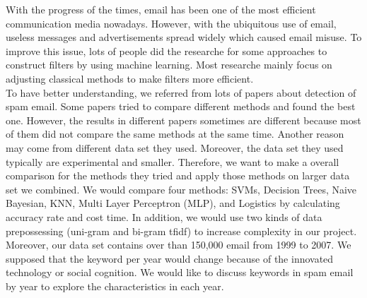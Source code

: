 
With the progress of the times, email has been one of the most efficient communication media nowadays. However, with the ubiquitous use of email, useless messages and advertisements spread widely which caused email misuse. To improve this issue, lots of people did the researche for some approaches to construct filters by using machine learning. Most researche mainly focus on adjusting classical methods to make filters more efficient.\\

To have better understanding, we referred from lots of papers about detection of spam email. Some papers tried to compare different methods and found the best one. However, the results in different papers sometimes are different because most of them did not compare the same methods at the same time. Another reason may come from different data set they used. Moreover, the data set they used typically are experimental and smaller. Therefore, we want to make a overall comparison for the methods they tried and apply those methods on larger data set we combined. We would compare four methods: SVMs, Decision Trees, Naive Bayesian, KNN, Multi Layer Perceptron (MLP), and Logistics by calculating accuracy rate and cost time. In addition, we would use two kinds of data prepossessing (uni-gram and bi-gram tfidf) to increase complexity in our project.\\

Moreover, our data set contains over than 150,000 email from 1999 to 2007. We supposed that the keyword per year would change because of the innovated technology or social cognition. We would like to discuss keywords in spam email by year to explore the characteristics in each year.\\


